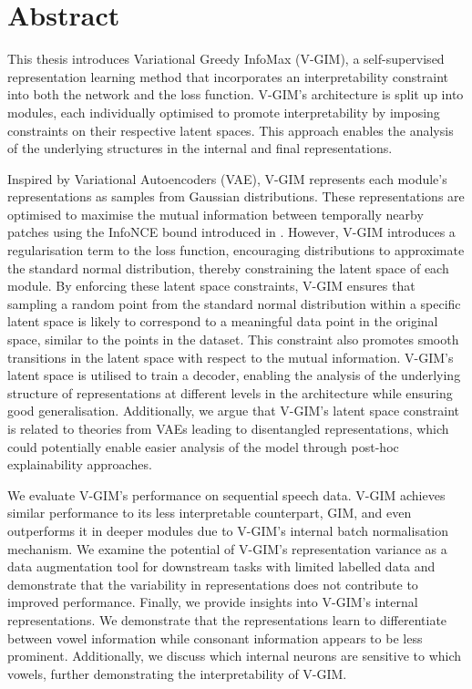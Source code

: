 \chapter*{ Abstract}
This thesis introduces Variational Greedy InfoMax (V-GIM), a self-supervised representation learning method that incorporates an interpretability constraint into both the network and the loss function. V-GIM's architecture is split up into modules, each individually optimised to promote interpretability by imposing constraints on their respective latent spaces. This approach enables the analysis of the underlying structures in the internal and final representations.

Inspired by Variational Autoencoders (VAE), V-GIM represents each module's representations as samples from Gaussian distributions. These representations are optimised to maximise the mutual information between temporally nearby patches using the InfoNCE bound introduced in \citep{oordRepresentationLearningContrastive2019}. However, V-GIM introduces a regularisation term to the loss function, encouraging distributions to approximate the standard normal distribution, thereby constraining the latent space of each module. By enforcing these latent space constraints, V-GIM ensures that sampling a random point from the standard normal distribution within a specific latent space is likely to correspond to a meaningful data point in the original space, similar to the points in the dataset. This constraint also promotes smooth transitions in the latent space with respect to the mutual information. V-GIM's latent space is utilised to train a decoder, enabling the analysis of the underlying structure of representations at different levels in the architecture while ensuring good generalisation. Additionally, we argue that V-GIM's latent space constraint is related to theories from VAEs leading to disentangled representations, which could potentially enable easier analysis of the model through post-hoc explainability approaches. 

We evaluate V-GIM's performance on sequential speech data. V-GIM achieves similar performance to its less interpretable counterpart, GIM, and even outperforms it in deeper modules due to V-GIM's internal batch normalisation mechanism. We examine the potential of V-GIM's representation variance as a data augmentation tool for downstream tasks with limited labelled data and demonstrate that the variability in representations does not contribute to improved performance. Finally, we provide insights into V-GIM's internal representations. We demonstrate that the representations learn to differentiate between vowel information while consonant information appears to be less prominent. Additionally, we discuss which internal neurons are sensitive to which vowels, further demonstrating the interpretability of V-GIM.

